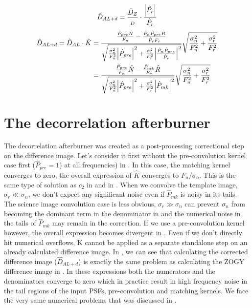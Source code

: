%
\begin{equation}
\hat{D}_{AL+d} = \frac{\hat{D}_Z}{_D}\cdot\frac{\abs{\hat{P}_r}}{\hat{P}_r}
\end{equation}
%
\begin{align}
  \hat{D}_{AL+d} =  \hat{D}_{AL} \cdot \hat{K}  &= \frac
  {\frac{\hat{P}_{pre}\hat{N}}{F_n} -
    \frac{\hat{P}_n\hat{P}_{pre}\hat{R}}{\hat{P}_r F_r} }
  {\sqrt{\frac{\sigma_n^2}{F_n^2}\abs{\hat{P}_{pre}}^2 +
      \frac{\sigma_r^2}{F_r^2}\abs{\frac{\hat{P}_n\hat{P}_{pre}}{\hat{P}_r}}^2}}
  \sqrt{\frac{\sigma_n^2}{F_n^2} + \frac{\sigma_r^2}{F_r^2}}
  \label{eq:DalPre}\\
%
  &= \frac
  {\frac{\hat{P}_{pre}}{F_n}\hat{N} -
    \frac{\hat{P}_{mk}}{F_r}\hat{R} }
  {\sqrt{\frac{\sigma_n^2}{F_n^2}\abs{\hat{P}_{pre}}^2 +
      \frac{\sigma_r^2}{F_r^2}\abs{\hat{P}_{mk}}^2}}
  \sqrt{\frac{\sigma_n^2}{F_n^2} + \frac{\sigma_r^2}{F_r^2}}\label{eq:DaldPreMk}
\end{align}
%
\section{The decorrelation afterburner}
The decorrelation afterburner was created as a post-processing
correctional step on the difference image. Let's consider it first
without the pre-convolution kernel case first (\(\hat{P}_{pre}=1\)) at all
frequencies) in . In this case, the matching kernel
converges to zero, the overall expression of \(\hat{K}\) converges to
\(F_{n}/\sigma_n\). This is the same type of solution as \(c_2\) in
 and in .
When we convolve the template image, \(\sigma_r \ll \sigma_n\), we
don't expect any significant noise even if \(\hat{P}_{mk}\) is noisy
in its tails.
%
The science image convolution case is less obvious, \(\sigma_r \gg
\sigma_n\) can prevent \(\sigma_{n}\) from becoming the dominant term
in the denominator in  and the numerical noise in the tails
of \(\hat{P}_{mk}\) may remain in the correction.
%
If we use a pre-convolution kernel however, the overall expression becomes
divergent in . Even if we don't directly hit numerical
overflows, K cannot be applied as a separate standalone step on an
already calculated difference image. In , we can
see that calculating the corrected difference image (\(\hat{D}_{AL+d}\))
is exactly the same problem as calculating the ZOGY difference image
in . In these expressions both the numerators and the
denominators converge to zero which in practice result in high
frequency noise in the tail regions of the input PSFs, pre-convolution
and matching kernels. We face the very same numerical problems that was
discussed in .
% 
